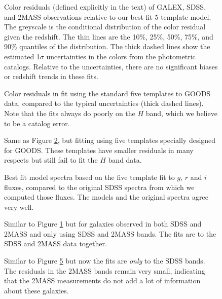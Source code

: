 \clearpage
{}
\begin{figure}
\figurenum{\fignum}
\caption{\label{fullfits} Color residuals (defined explicitly in the
	text) of GALEX, SDSS, and 2MASS observations relative to our best
	fit 5-template model.  The greyscale is the conditional distribution
	of the color residual given the redshift.  The thin lines are the
	10\%, 25\%, 50\%, 75\%, and 90\% quantiles of the distribution. The
	thick dashed lines show the estimated 1$\sigma$ uncertainties in the
	colors from the photometric catalogs. Relative to the uncertainties,
	there are no significant biases or redshift trends in these fits. }
\end{figure}

\clearpage
{}
\begin{figure}
\figurenum{\fignum}
\caption{\label{goods} Color residuals in fit using the standard five
templates to GOODS data, compared to the typical uncertainties (thick
dashed lines). Note that the fits always do poorly on the $H$ band,
which we believe to be a catalog error. }
\end{figure}

\clearpage
{}
\begin{figure}
\figurenum{\fignum}
\caption{\label{goods_special} Same as Figure \ref{goods}, but fitting
using five templates specially designed for GOODS. These templates
have smaller residuals in many respects but still fail to fit the $H$
band data. }
\end{figure}

\clearpage
{}
\begin{figure}
\figurenum{\fignum}
\caption{\label{specfit} Best fit model spectra based on the five
template fit to $g$, $r$ and $i$ fluxes, compared to the original
SDSS spectra from which we computed those fluxes.  The models and the
original spectra agree very well.}
\end{figure}

\clearpage
{}
\begin{figure}
\figurenum{\fignum}
\caption{\label{twomass_resid} Similar to Figure \ref{fullfits} but
for galaxies observed in both SDSS and 2MASS and only using SDSS and
2MASS bands. The fits are to the SDSS and 2MASS data together.}
\end{figure}

\clearpage
{}
\begin{figure}
\figurenum{\fignum}
\caption{\label{twomass_predicted} Similar to Figure
\ref{twomass_resid} but now the fits are {\it only} to the SDSS
bands. The residuals in the 2MASS bands remain very small, indicating
that the 2MASS measurements do not add a lot of information about
these galaxies.}
\end{figure}

